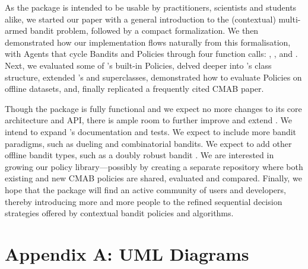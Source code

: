 \documentclass{jss}
\begin{document}
As the package is intended to be usable by practitioners, scientists and students alike, we started our paper with a general introduction to the (contextual) multi-armed bandit problem, followed by a compact formalization. We then demonstrated how our implementation flows naturally from this formalisation, with Agents that cycle Bandits and Policies through four function calls: , ,  and . Next, we evaluated some of 's built-in Policies, delved deeper into 's class structure, extended 's  and  superclasses, demonstrated how to evaluate Policies on offline datasets, and, finally replicated a frequently cited CMAB paper.

Though the package is fully functional and we expect no more changes to its core architecture and API, there is ample room to further improve and extend . We intend to expand 's documentation and tests. We expect to include more bandit paradigms, such as dueling and combinatorial bandits. We expect to add other offline bandit types, such as a doubly robust bandit \citep{Dudik2011}. We are interested in growing our policy library---possibly by creating a separate repository where both existing and new CMAB policies are shared, evaluated and compared. Finally, we hope that the package will find an active community of users and developers, thereby introducing more and more people to the refined sequential decision strategies offered by contextual bandit policies and algorithms.


%


\newpage

\section{Appendix A: UML Diagrams} \label{uml}
\end{document}
